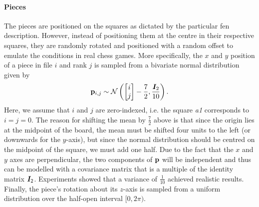 \documentclass[../main.tex]{subfiles}
\begin{document}
\paragraph{Pieces}
The pieces are positioned on the squares as dictated by the particular \gls{fen} description.
However, instead of positioning them at the centre in their respective squares, they are randomly rotated and positioned with a random offset to emulate the conditions in real chess games.
More specifically, the $x$ and $y$ position of a piece in file $i$ and rank $j$ is sampled from a bivariate normal distribution given by
\begin{equation*}
    {\mathbf{p}}_{i,j} \sim \mathcal{N} \left(
        \begin{bmatrix}
            i \\ j
        \end{bmatrix} - \frac{7}{2},
        \frac{{\bm{I}}_2}{10}
    \right).
\end{equation*}
Here, we assume that $i$ and $j$ are zero-indexed, i.e. the square \emph{a1} corresponds to $i=j=0$.
The reason for shifting the mean by $\frac{7}{2}$ above is that since the origin lies at the midpoint of the board, the mean must be shifted four units to the left (or downwards for the $y$-axis), but since the normal distribution should be centred on the midpoint of the square, we must add one half.
Due to the fact that the $x$ and $y$ axes are perpendicular, the two components of ${\mathbf{p}}$ will be independent and thus can be modelled with a covariance matrix that is a multiple of the identity matrix ${\bm{I}}_2$.
Experiments showed that a variance of $\frac{1}{10}$ achieved realistic results.
Finally, the piece's rotation about its $z$-axis is sampled from a uniform distribution over the half-open interval $[0, 2\pi)$.
\end{document}
